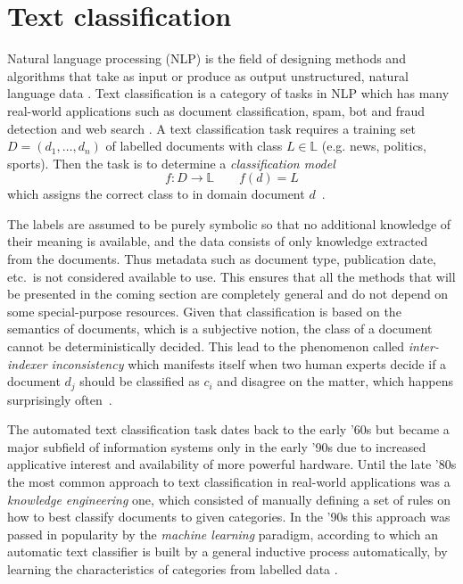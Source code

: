 \chapter{Text classification} \label{Text classification}

Natural language processing (NLP) is the field of designing methods and algorithms that take as input or produce as output unstructured, natural language data \cite{goldberg2017}.
Text classification is a category of tasks in NLP which has many real-world applications such as document classification, spam, bot and fraud detection and web search \cite{howard2018,joulin2016}.
A text classification task requires a training set $D = (d_1, \dots , d_n)$ of labelled documents with class $L \in \mathbb{L}$ (e.g. news, politics, sports). Then the task is to determine a \textit{classification model}
\begin{equation}
  f : D \rightarrow \mathbb{L}\qquad f(d) = L
\end{equation}
which assigns the correct class to in domain document $d$~\cite{hotho}.

The labels are assumed to be purely symbolic so that no additional knowledge of their meaning is available, and the data consists of only knowledge extracted from the documents. Thus metadata such as document type, publication date, etc.\ is not considered available to use.
This ensures that all the methods that will be presented in the coming section are completely general and do not depend on some special-purpose resources.
Given that classification is based on the semantics of documents, which is a subjective notion, the class of a document cannot be deterministically decided.
This lead to the phenomenon called \textit{inter-indexer inconsistency} which manifests itself when two human experts decide if a document $d_j$ should be classified as $c_i$ and disagree on the matter, which happens surprisingly often~\cite{sebastiani2002}.

The automated text classification task dates back to the early '60s but became a major subfield of information systems only in the early '90s due to increased applicative interest and availability of more powerful hardware.
Until the late '80s the most common approach to text classification in real-world applications was a \textit{knowledge engineering} one, which consisted of manually defining a set of rules on how to best classify documents to given categories.
In the '90s this approach was passed in popularity by the \textit{machine learning} paradigm, according to which an automatic text classifier is built by a general inductive process automatically, by learning the characteristics of categories from labelled data \cite{sebastiani2002}.

